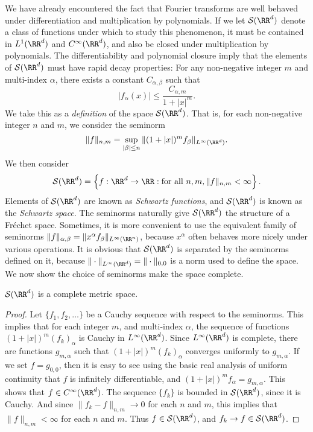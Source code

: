 We have already encountered the fact that Fourier transforms are well behaved under differentiation and multiplication by polynomials. If we let $\mathcal{S}(\RR^d)$ denote a class of functions under which to study this phenomenon, it must be contained in $L^1(\RR^d)$ and $C^\infty(\RR^d)$, and also be closed under multiplication by polynomials. The differentiability and polynomial closure imply that the elements of $\mathcal{S}(\RR^d)$ must have rapid decay properties: For any non-negative integer $m$ and multi-index $\alpha$, there exists a constant $C_{\alpha,\beta}$ such that
%
\[ |f_\alpha(x)| \leq \frac{C_{\alpha,m}}{1 + |x|^m}. \]
%
We take this as a \emph{definition} of the space $\mathcal{S}(\RR^d)$. That is, for each non-negative integer $n$ and $m$, we consider the seminorm
%
\[ \| f \|_{n,m} = \sup_{|\beta| \leq n} \| (1 + |x|)^m f_\beta \|_{L^\infty(\RR^d)}. \]
%
We then consider
%
\[ \mathcal{S}(\RR^d) = \left\{ f: \RR^d \to \RR: \text{for all}\ n,m, \| f \|_{n,m} < \infty \right\}. \]
%
Elements of $\mathcal{S}(\RR^d)$ are known as \emph{Schwartz functions}, and $\mathcal{S}(\RR^d)$ is known as the \emph{Schwartz space}. The seminorms naturally give $\mathcal{S}(\RR^d)$ the structure of a Fr\'{e}chet space. Sometimes, it is more convenient to use the equivalent family of seminorms $\| f \|_{\alpha, \beta} = \| x^\alpha f_\beta \|_{L^\infty(\RR^n)}$, because $x^\alpha$ often behaves more nicely under various operations. It is obvious that $\mathcal{S}(\RR^d)$ is separated by the seminorms defined on it, because $\| \cdot \|_{L^\infty(\RR^d)} = \| \cdot \|_{0,0}$ is a norm used to define the space. We now show the choice of seminorms make the space complete.

\begin{theorem}
	$\mathcal{S}(\RR^d)$ is a complete metric space.
\end{theorem}
\begin{proof}
	Let $\{ f_1,f_2, \dots \}$ be a Cauchy sequence with respect to the seminorms. This implies that for each integer $m$, and multi-index $\alpha$, the sequence of functions $(1 + |x|)^m (f_k)_\alpha$ is Cauchy in $L^\infty(\RR^d)$. Since $L^\infty(\RR^d)$ is complete, there are functions $g_{m,\alpha}$ such that $(1 + |x|)^m (f_k)_\alpha$ converges uniformly to $g_{m,\alpha}$. If we set $f = g_{0,0}$, then it is easy to see using the basic real analysis of uniform continuity that $f$ is infinitely differentiable, and $(1 + |x|)^m f_\alpha = g_{m,\alpha}$. This shows that $f \in C^\infty(\RR^d)$. The sequence $\{ f_k \}$ is bounded in $\mathcal{S}(\RR^d)$, since it is Cauchy. And since $\| f_k - f \|_{n,m} \to 0$ for each $n$ and $m$, this implies that $\| f \|_{n,m} < \infty$ for each $n$ and $m$. Thus $f \in \mathcal{S}(\RR^d)$, and $f_k \to f \in \mathcal{S}(\RR^d)$.
\end{proof}

